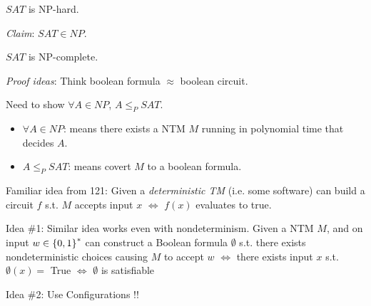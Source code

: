 \begin{theorem}
     $SAT$ is NP-hard.
\end{theorem}

\emph{Claim}: $SAT \in NP$.

\begin{corollary}
    $SAT$ is NP-complete.
\end{corollary}

\emph{Proof ideas}: Think boolean formula $\approx$ boolean circuit.

Need to show $\forall A \in NP$, $A \leq_{P} SAT$.

\begin{itemize}
    \item $\forall A \in NP$: means there exists a NTM $M$ running in polynomial time that decides $A$.
    \item $A \leq_{P} SAT$: means covert $M$ to a boolean formula.
\end{itemize}

Familiar idea from 121: Given a \emph{deterministic TM} (i.e. some software) can build a circuit $f$ s.t. $M$ accepts input $x$ $\Leftrightarrow$ $f(x)$ evaluates to true.

Idea \#1: Similar idea works even with nondeterminism. Given a NTM $M$, and on input $w \in \left \{ 0, 1 \right \}^*$ can construct a Boolean formula $\emptyset$ s.t. there exists nondeterministic choices causing $M$ to accept $w$ $\Leftrightarrow$ there exists input $x$ s.t. $\emptyset(x) =$ True $\Leftrightarrow$ $\emptyset$ is satisfiable

Idea \#2: Use Configurations !!
